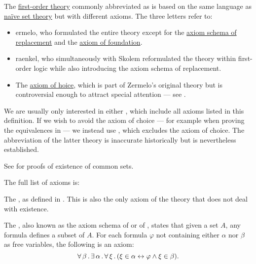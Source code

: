 \begin{definition}\label{def:zfc}
  The \hyperref[def:first_order_theory]{first-order theory} commonly abbreviated as  is based on the same language as \hyperref[def:naive_set_theory]{na\"ive set theory} but with different axioms. The three letters refer to:
  \begin{itemize}
    \item {}ermelo, who formulated the entire theory except for the \hyperref[def:zfc/replacement]{axiom schema of replacement} and the \hyperref[def:zfc/foundation]{axiom of foundation}.
    \item{} raenkel, who simultaneously with Skolem reformulated the theory within first-order logic while also introducing the axiom schema of replacement.
    \item The \hyperref[def:zfc/choice]{axiom of hoice}, which is part of Zermelo's original theory but is controversial enough to attract special attention --- see .
  \end{itemize}

  We are usually only interested in either , which include all axioms listed in this definition. If we wish to avoid the axiom of choice --- for example when proving the equivalences in  --- we instead use , which excludes the axiom of choice. The abbreviation of the latter theory is inaccurate historically but is nevertheless established.

  See  for proofs of existence of common sets.

  The full list of axioms is:
  \begin{thmenum}
     The , as defined in . This is also the only axiom of the theory that does not deal with existence.

     The , also known as the axiom schema of  or of , states that given a set \( A \), any formula defines a subset of \( A \). For each formula \( \varphi \) not containing either \( \alpha \) nor \( \beta \) as free variables, the following is an axiom:
    \begin{equation}\label{eq:def:zfc/specification}
      \forall \thinspace \beta \thinspace . \thinspace \exists \thinspace \alpha \thinspace . \thinspace \forall \thinspace \xi \thinspace . \thinspace (\xi \in \alpha \leftrightarrow \varphi \wedge \xi \in \beta).
    \end{equation}


\end{thmenum}
\end{definition}
